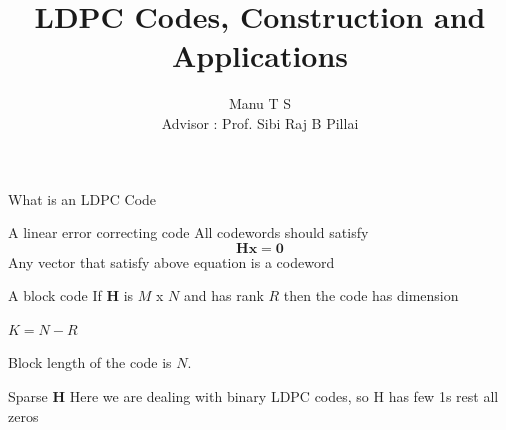 \documentclass{beamer}
\title[]{LDPC Codes, Construction and Applications}
\author[Manu T S]{Manu T S \\ {\footnotesize Advisor : Prof. Sibi Raj B Pillai}}
\institute[IITB]{IIT Bombay}
\begin{document}
  \frame{\titlepage}

    \begin{frame}{What is an LDPC Code}
    \begin{block}{A linear error correcting code}
      All codewords should satisfy
      \begin{equation}
       \mathbf{Hx} = \mathbf{0}
      \end{equation}
      Any vector that satisfy above equation is a codeword
    \end{block}
    \begin{block}{A block code}
      If \textbf{H} is $M$ x $N$ and has rank $R$ then the code has dimension
      \begin{center}
	$K = N - R$
      \end{center}
      Block length of the code is $N$.
    \end{block}
    \begin{block}{Sparse \textbf{H}}
      Here we are dealing with binary LDPC codes, so H has few 1s rest all zeros
    \end{block}
  \end{frame}
%   
\end{document}
